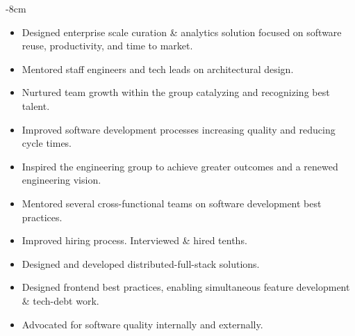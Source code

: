 \documentclass[10pt,a4paper]{altacv}
\begin{document}

\begin{adjustwidth}{}{-8cm}
\makecvheader
\end{adjustwidth}


\begin{itemize}
\item Designed enterprise scale curation \& analytics solution focused on software reuse, productivity, and time to market.
\item Mentored staff engineers and tech leads on architectural design.
\item Nurtured team growth within the group catalyzing and recognizing best talent.
\item Improved software development processes increasing quality and reducing cycle times.
\item Inspired the engineering group to achieve greater outcomes and a renewed engineering vision.
\end{itemize}
\divider

\begin{itemize}
\item Mentored several cross-functional teams on software development best practices.
\item Improved hiring process. Interviewed \& hired tenths.
\item Designed and developed distributed-full-stack solutions.
\item Designed frontend best practices, enabling simultaneous feature development \& tech-debt work.
\item Advocated for software quality internally and externally.
\end{itemize}
\divider
\end{document}

